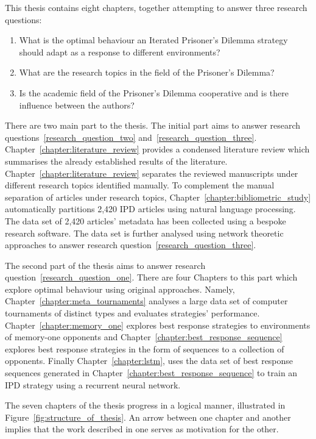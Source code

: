 This thesis contains eight chapters, together attempting to answer three research
questions:

\begin{enumerate}
    \item What is the optimal behaviour an Iterated Prisoner's Dilemma strategy should adapt as a response to different
 environments?\label{research_question_one}
    \item What are the research topics in the field of the Prisoner's Dilemma?\label{research_question_two}
    \item Is the academic field of the Prisoner's Dilemma cooperative and is there
    influence between the authors?\label{research_question_three}
\end{enumerate}

There are two main part to the thesis. The initial part aims to answer research
questions~\ref{research_question_two} and~\ref{research_question_three}.
Chapter~\ref{chapter:literature_review} provides a condensed
literature review which summarises the already established results of the
literature. Chapter~\ref{chapter:literature_review} separates the reviewed manuscripts
under different research topics identified manually. To complement the manual
separation of articles under research topics,
Chapter~\ref{chapter:bibliometric_study} automatically partitions 2,420 IPD
articles using natural language processing. The data set of 2,420 articles' metadata has
been collected using a bespoke research software. The data set is further
analysed using network theoretic approaches to answer research question~\ref{research_question_three}.

The second part of the thesis aims to answer research
question~\ref{research_question_one}. There are four Chapters to this part which
explore optimal behaviour using original approaches. Namely,
Chapter~\ref{chapter:meta_tournaments} analyses a large data set of computer
tournaments of distinct types and evaluates \numberofstrategies strategies'
performance. Chapter~\ref{chapter:memory_one} explores best response strategies
to environments of memory-one opponents and
Chapter~\ref{chapter:best_response_sequence} explores best response strategies
in the form of sequences to a collection of opponents. Finally
Chapter~\ref{chapter:lstm}, uses the data set of best response sequences
generated in Chapter~\ref{chapter:best_response_sequence} to train an IPD
strategy using a recurrent neural network.

The seven chapters of the thesis progress in a logical manner, illustrated in
Figure~\ref{fig:structure_of_thesis}. An arrow between one chapter and another
implies that the work described in one serves as motivation for the other.

